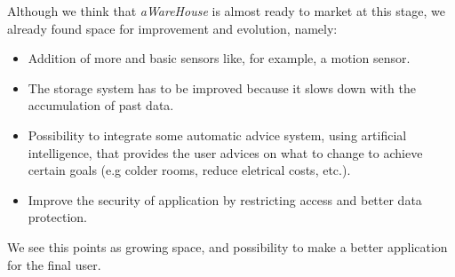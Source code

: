 \documentclass[12pt]{report}
\begin{document}
Although we think that \textit{aWareHouse} is almost ready to market at this stage, we already found space for improvement and evolution, namely:
\begin{itemize}
 \item Addition of more and basic sensors like, for example, a motion sensor.
 \item The storage system has to be improved because it slows down with the  accumulation of past data.
 \item Possibility to integrate some automatic advice system, using artificial intelligence, that provides the user advices on what to change to achieve certain goals (e.g colder rooms, reduce eletrical costs, etc.).
 \item Improve the security of application by restricting access and better data protection.
\end{itemize} 

We see this points as growing space, and possibility to make a better application for the final user.
\end{document}
